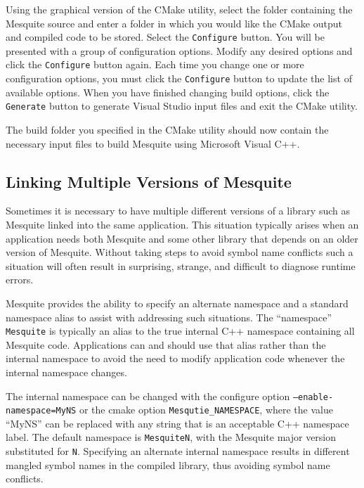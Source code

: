Using the graphical version of the CMake utility, select the folder containing the Mesquite source and enter a folder in which you would like the CMake output and compiled code to be stored.  Select the \texttt{Configure} button.  You will be presented with a group of configuration options.  Modify any desired options and click the \texttt{Configure} button again.  Each time you change one or more configuration options, you must click the \texttt{Configure} button to update the list of available options.  When you have finished changing build options, click the \texttt{Generate} button to generate Visual Studio input files and exit the CMake utility.

The build folder you specified in the CMake utility should now contain the necessary input files to build Mesquite using Microsoft Visual C++.  

\subsection{Linking Multiple Versions of Mesquite \label{namespace_mangling} }

Sometimes it is necessary to have multiple different versions of a library 
such as Mesquite linked into the same application.  This situation typically
arises when an application needs both Mesquite and some other library that depends on an older version of Mesquite.  Without taking steps to avoid symbol
name conflicts such a situation will often result in surprising, strange, and
difficult to diagnose runtime errors.  

Mesquite provides the ability to specify an alternate namespace and a standard
namespace alias to assist with addressing such situations.  The ``namespace'' \texttt{Mesquite} is typically an alias to the true internal C++ namespace containing all Mesquite code.  Applications can and should use that alias rather than the internal namespace to avoid the need to modify application code whenever the internal namespace changes.  

The internal namespace can be changed with the configure option \texttt{--enable-namespace=MyNS} or the cmake option \texttt{Mesqutie\_NAMESPACE}, where the value ``MyNS'' can be replaced with any string that is an acceptable C++ namespace label.  The default namespace is \texttt{MesquiteN}, with the Mesquite major version substituted for \texttt{N}.  Specifying an alternate internal namespace results in different mangled symbol names in the compiled library, thus avoiding symbol name conflicts.

